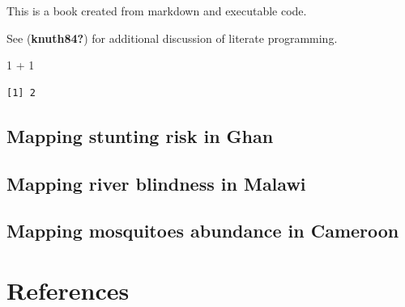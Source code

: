 \documentclass[
  letterpaper,
]{krantz}
\newenvironment{Shaded}{\begin{snugshade}}{\end{snugshade}}
\newcommand{\DecValTok}[1]{\textcolor[rgb]{0.68,0.00,0.00}{#1}}
\newcommand{\SpecialCharTok}[1]{\textcolor[rgb]{0.37,0.37,0.37}{#1}}
\begin{document}
This is a book created from markdown and executable code.

See (\textbf{knuth84?}) for additional discussion of literate
programming.

\begin{Shaded}
\begin{Highlighting}[]
\DecValTok{1} \SpecialCharTok{+} \DecValTok{1}
\end{Highlighting}
\end{Shaded}

\begin{verbatim}
[1] 2
\end{verbatim}

\hypertarget{mapping-stunting-risk-in-ghan}{%
\section{Mapping stunting risk in
Ghan}\label{mapping-stunting-risk-in-ghan}}

\hypertarget{mapping-river-blindness-in-malawi}{%
\section{Mapping river blindness in
Malawi}\label{mapping-river-blindness-in-malawi}}

\hypertarget{mapping-mosquitoes-abundance-in-cameroon}{%
\section{Mapping mosquitoes abundance in
Cameroon}\label{mapping-mosquitoes-abundance-in-cameroon}}


\hypertarget{references}{%
\chapter*{References}\label{references}}

\end{document}
